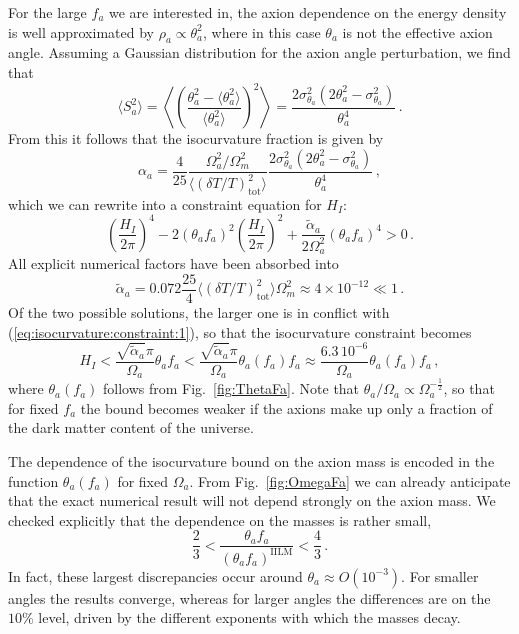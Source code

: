 \documentclass[preprint,nofootinbib]{revtex4}
\newcommand{\reffig}[1]{Fig.~\ref{#1}}
\begin{document}
For the large $f_a$ we are interested in, the axion dependence on the energy density is well approximated by $\rho_a \propto \theta^2_a$, where in this case $\theta_a$ is not the effective axion angle. Assuming a Gaussian distribution for the axion angle perturbation, we find that
\begin{equation}
 \langle S^2_a \rangle = \left\langle \left(\frac{\theta_a^2-\langle \theta_a^2 \rangle}{\langle \theta_a^2 \rangle}\right)^2 \right\rangle = \frac{2\sigma_{\theta_a}^2(2\theta_a^2-\sigma_{\theta_a}^2)}{\theta_a^4}\,.\label{eq:entropy:perturbation:harmonic}
\end{equation}
From this it follows that the isocurvature fraction is given by
\begin{equation}
\alpha_a = \frac{4}{25} \frac{\Omega_a^2/\Omega_m^2}{\langle(\delta T/T)^2_\mathrm{tot}\rangle} \frac{2\sigma_{\theta_a}^2(2\theta_a^2-\sigma_{\theta_a}^2)}{\theta_a^4}\,,
\end{equation}
which we can rewrite into a constraint equation for $H_I$:
\begin{equation}
 \left(\frac{H_I}{2\pi}\right)^4 - 2 (\theta_a f_a)^2 \left(\frac{H_I}{2\pi}\right)^2 + \frac{\tilde{\alpha}_a}{2\Omega_a^2} (\theta_a f_a)^4 > 0\,.
\end{equation}
All explicit numerical factors have been absorbed into 
\begin{equation}
 \tilde{\alpha}_a = 0.072 \frac{25}{4} \langle(\delta T/T)^2_\mathrm{tot}\rangle \Omega_m^2\approx4\times10^{-12}\ll 1\,.
\end{equation}
Of the two possible solutions, the larger one is in conflict with (\ref{eq:isocurvature:constraint:1}), so that the isocurvature constraint becomes
\begin{equation}
 H_I < \frac{\sqrt{\tilde{\alpha}_a}\pi}{\Omega_a} \theta_a f_a < \frac{\sqrt{\tilde{\alpha}_a}\pi}{\Omega_a} \theta_a(f_a) f_a \approx \frac{6.3\,10^{-6}}{\Omega_a}\theta_a(f_a) f_a\,, \label{eq:axion:isocurvature:harmonic}
\end{equation}
where $\theta_a(f_a)$ follows from \reffig{fig:ThetaFa}. Note that $\theta_a/\Omega_a \propto \Omega_a^{-\frac{1}{2}}$, so that for fixed $f_a$ the bound becomes weaker if the axions make up only a fraction of the dark matter content of the universe. 

The dependence of the isocurvature bound on the axion mass is encoded in the function $\theta_a(f_a)$ for fixed $\Omega_a$. From \reffig{fig:OmegaFa} we can already anticipate that the exact numerical result will not depend strongly on the axion mass. We checked explicitly that the dependence on the masses is rather small,
\begin{equation*}
 \frac{2}{3} < \frac{\theta_a f_a}{(\theta_a f_a)^\mathrm{IILM}} < \frac{4}{3}\,.
\end{equation*}
In fact, these largest discrepancies occur around $\theta_a \approx O(10^{-3})$. For smaller angles the results converge, whereas for larger angles the differences are on the $10\%$ level, driven by the different exponents with which the masses decay. 
\end{document}
